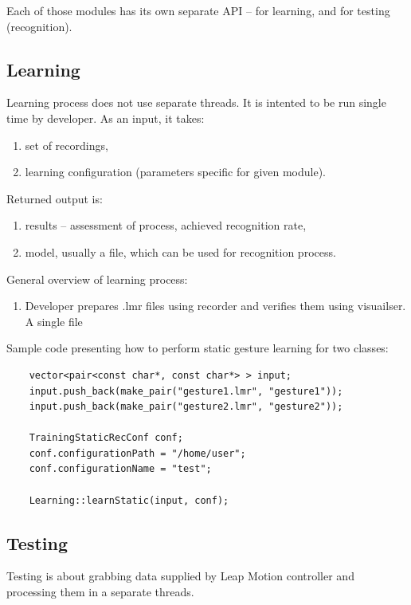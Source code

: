 Each of those modules has its own separate API -- for learning, and for testing (recognition).
	
\subsection{Learning}

Learning process does not use separate threads. It is intented to be run single time by developer. As an input, it takes:
\begin{enumerate}
	\item set of recordings,
	\item learning configuration (parameters specific for given module).
\end{enumerate}
Returned output is:
\begin{enumerate}
	\item results -- assessment of process, achieved recognition rate,
	\item model, usually a file, which can be used for recognition process.
\end{enumerate}

General overview of learning process:
\begin{enumerate}
	\item Developer prepares .lmr files using recorder and verifies them using visuailser. A single file 
\end{enumerate}

Sample code presenting how to perform static gesture learning for two classes:
\begin{lstlisting}
	vector<pair<const char*, const char*> > input;
	input.push_back(make_pair("gesture1.lmr", "gesture1"));
	input.push_back(make_pair("gesture2.lmr", "gesture2"));

	TrainingStaticRecConf conf;
	conf.configurationPath = "/home/user";
	conf.configurationName = "test";

	Learning::learnStatic(input, conf);
\end{lstlisting}


\subsection{Testing}

Testing is about grabbing data supplied by Leap Motion controller and processing them in a separate threads.


